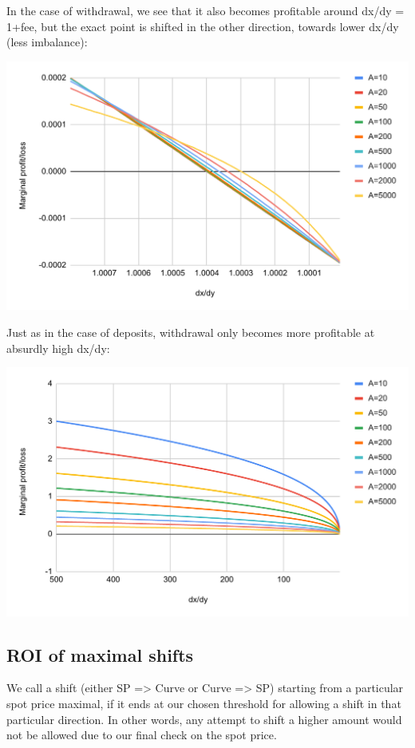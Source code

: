 \documentclass{article}
\begin{document}
In the case of withdrawal, we see that it also becomes profitable around dx/dy = 1+fee, but the exact point is shifted in the other direction, towards lower dx/dy (less imbalance):

\includegraphics[width=\linewidth]{./LUSDChickenBonds_Shifting_Profitability_3.png}

Just as in the case of deposits, withdrawal only becomes more profitable at absurdly high dx/dy:

\includegraphics[width=\linewidth]{./LUSDChickenBonds_Shifting_Profitability_4.png}

\subsection{ROI of maximal shifts}

We call a shift (either SP => Curve or Curve => SP) starting from a particular spot price maximal, if it ends at our chosen threshold for allowing a shift in that particular direction. In other words, any attempt to shift a higher amount would not be allowed due to our final check on the spot price.
\end{document}
